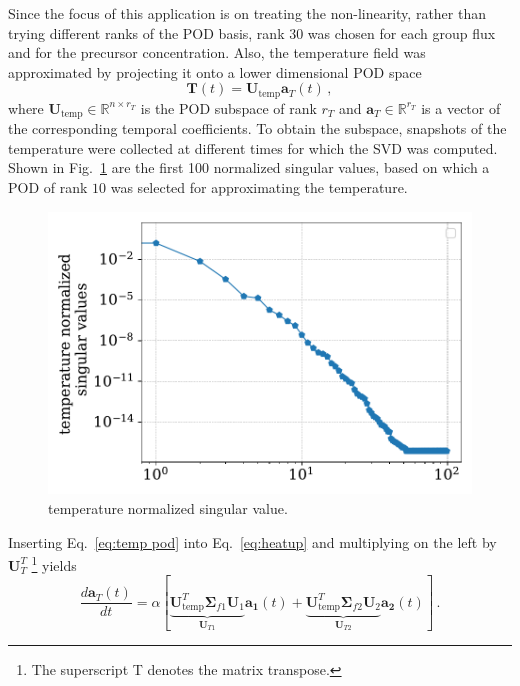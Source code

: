 \documentclass[]{interact}
\theoremstyle{plain}%
\theoremstyle{definition}
\theoremstyle{remark}
\begin{document}
Since the focus of this application is on treating the non-linearity, rather than trying different ranks of the POD basis, rank 30 was chosen for each group flux and for the precursor concentration.
Also, the temperature field was approximated by projecting it onto a lower dimensional POD space
\begin{equation}
\mathbf{T}(t) = \mathbf{U}_{\text{temp}}\mathbf{a}_T(t) \, ,
\label{eq:temp pod}
\end{equation}
where $\mathbf{U}_{\text{temp}}\in\mathbb{R}^{n \times r_T} $ is the POD subspace of rank $r_T$ and $\mathbf{a}_T\in \mathbb{R}^{r_T}$ is a vector of the corresponding temporal coefficients. 
To obtain the subspace, snapshots of the temperature were collected at different times for which the SVD was computed.
Shown in Fig.~\ref{fig:lra T singular values} are the first 100 normalized singular values, based on which a POD of rank $10$ was selected for approximating the temperature.
\begin{figure}[H]
	\centering
	\includegraphics[width=1.0\linewidth]{../figures/LRA_T_singular_values.pdf}
	\caption{temperature normalized singular value.}
	\label{fig:lra T singular values}
\end{figure}
Inserting Eq.~\ref{eq:temp pod} into Eq.~\ref{eq:heatup} and multiplying on the left by $\mathbf{U}_T^T$ \footnote{The superscript T denotes the matrix transpose.} yields
\begin{equation}
\frac{d\mathbf{a}_T(t)}{dt}  = \alpha [\underbrace{\mathbf{U}_{\text{temp}}^T \boldsymbol{\Sigma}_{f1}\mathbf{U}_1}_{\mathbf{U}_{T1}}\mathbf{a_1}(t) + \underbrace{\mathbf{U}_{\text{temp}}^T\boldsymbol{\Sigma}_{f2}\mathbf{U}_2}_{\mathbf{U}_{T2}}\mathbf{a_2}(t)] \, .
\label{eq:reduced temp}
\end{equation}
\end{document}
